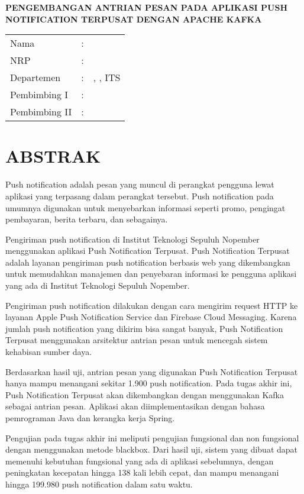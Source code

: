 \begin{center}
	\centering\noindent\textbf{\MakeUppercase{Pengembangan Antrian Pesan pada Aplikasi Push Notification Terpusat dengan Apache Kafka}}
\end{center}
\vspace*{1em}

\noindent\begin{tabularx}{\linewidth}{l l X}
	Nama & : & \penulis \\
	NRP & :	& \nrp \\
	Departemen & : & \jurusan, \newline \fakultas, ITS \\
	Pembimbing I & : & \pembimbingsatu \\
	Pembimbing II & : & \pembimbingdua
\end {tabularx}

{\let\clearpage\relax\titlespacing{\chapter}{0em}{0em}{1em} \chapter{ABSTRAK}}
\itshape
\par Push notification adalah pesan yang muncul di perangkat pengguna lewat aplikasi yang terpasang dalam perangkat tersebut. Push notification pada umumnya digunakan untuk menyebarkan informasi seperti promo, pengingat pembayaran, berita terbaru, dan sebagainya.
\par Pengiriman push notification di Institut Teknologi Sepuluh Nopember menggunakan aplikasi Push Notification Terpusat. Push Notification Terpusat adalah layanan pengiriman push notification berbasis web yang dikembangkan untuk memudahkan manajemen dan penyebaran informasi ke pengguna aplikasi yang ada di Institut Teknologi Sepuluh Nopember.
\par Pengiriman push notification dilakukan dengan cara mengirim request HTTP ke layanan Apple Push Notification Service dan Firebase Cloud Messaging. Karena jumlah push notification yang dikirim bisa sangat banyak, Push Notification Terpusat menggunakan arsitektur antrian pesan untuk mencegah sistem kehabisan sumber daya.
\par Berdasarkan hasil uji, antrian pesan yang digunakan Push Notification Terpusat hanya mampu menangani sekitar 1.900 push notification. Pada tugas akhir ini, Push Notification Terpusat akan dikembangkan dengan menggunakan Kafka sebagai antrian pesan. Aplikasi akan diimplementasikan dengan bahasa pemrograman Java dan kerangka kerja Spring.
\par Pengujian pada tugas akhir ini meliputi pengujian fungsional dan non fungsional dengan menggunakan metode blackbox. Dari hasil uji, sistem yang dibuat dapat memenuhi kebutuhan fungsional yang ada di aplikasi sebelumnya, dengan peningkatan kecepatan hingga 138 kali lebih cepat, dan mampu menangani hingga 199.980 push notification dalam satu waktu.


